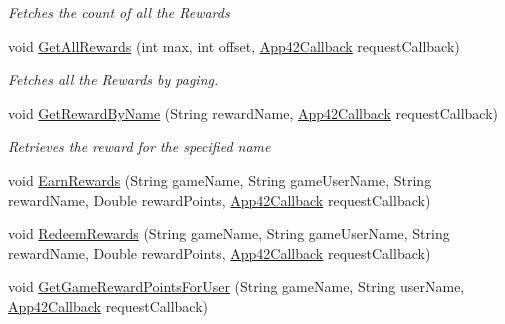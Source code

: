 \begin{DoxyCompactItemize}
\begin{DoxyCompactList}\small\item\em Fetches the count of all the Rewards \end{DoxyCompactList}\item 
void \hyperlink{classcom_1_1shephertz_1_1app42_1_1paas_1_1sdk_1_1windows_1_1reward_1_1_reward_service_a026357b371c3fff2d61cc266703b7888}{Get\+All\+Rewards} (int max, int offset, \hyperlink{interfacecom_1_1shephertz_1_1app42_1_1paas_1_1sdk_1_1windows_1_1_app42_callback}{App42\+Callback} request\+Callback)
\begin{DoxyCompactList}\small\item\em Fetches all the Rewards by paging. \end{DoxyCompactList}\item 
void \hyperlink{classcom_1_1shephertz_1_1app42_1_1paas_1_1sdk_1_1windows_1_1reward_1_1_reward_service_a78ebb72df1f7d9c67d68152dc716cf33}{Get\+Reward\+By\+Name} (String reward\+Name, \hyperlink{interfacecom_1_1shephertz_1_1app42_1_1paas_1_1sdk_1_1windows_1_1_app42_callback}{App42\+Callback} request\+Callback)
\begin{DoxyCompactList}\small\item\em Retrieves the reward for the specified name \end{DoxyCompactList}\item 
void \hyperlink{classcom_1_1shephertz_1_1app42_1_1paas_1_1sdk_1_1windows_1_1reward_1_1_reward_service_ac401bd0f7ef773a596d942b4e839de10}{Earn\+Rewards} (String game\+Name, String game\+User\+Name, String reward\+Name, Double reward\+Points, \hyperlink{interfacecom_1_1shephertz_1_1app42_1_1paas_1_1sdk_1_1windows_1_1_app42_callback}{App42\+Callback} request\+Callback)
\item 
void \hyperlink{classcom_1_1shephertz_1_1app42_1_1paas_1_1sdk_1_1windows_1_1reward_1_1_reward_service_a5d74aa90d0781e8dfe9a72362e07565e}{Redeem\+Rewards} (String game\+Name, String game\+User\+Name, String reward\+Name, Double reward\+Points, \hyperlink{interfacecom_1_1shephertz_1_1app42_1_1paas_1_1sdk_1_1windows_1_1_app42_callback}{App42\+Callback} request\+Callback)
\item 
void \hyperlink{classcom_1_1shephertz_1_1app42_1_1paas_1_1sdk_1_1windows_1_1reward_1_1_reward_service_ad23eb02679be1d871d97b216e4e80e6f}{Get\+Game\+Reward\+Points\+For\+User} (String game\+Name, String user\+Name, \hyperlink{interfacecom_1_1shephertz_1_1app42_1_1paas_1_1sdk_1_1windows_1_1_app42_callback}{App42\+Callback} request\+Callback)
\item 

\end{DoxyCompactItemize}
